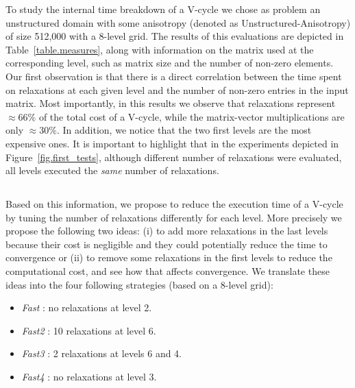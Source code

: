To study the internal time breakdown of a V-cycle we chose as problem an
unstructured domain with some anisotropy (denoted as Unstructured-Anisotropy)
of size 512,000 with a 8-level grid. The results of this evaluations are
depicted in Table~\ref{table.measures}, along with information on the matrix
used at the corresponding level, such as matrix size and the number of non-zero
elements.  Our first observation is that there is a direct correlation between
the time spent on relaxations at each given level and the number of non-zero
entries in the input matrix. Most importantly, in this results we observe that
relaxations represent $\approx66\%$ of the total cost of a V-cycle, while the
matrix-vector multiplications are only $\approx30\%$. In addition, we notice
that the two first levels are the most expensive ones.  It is important to
highlight that in the experiments depicted in Figure~\ref{fig.first_tests},
although different number of relaxations were evaluated, all levels executed
the \emph{same} number of relaxations.

\subsection{}

Based on this information, we propose to reduce the execution time of a V-cycle
by tuning the number of relaxations differently for each level. More precisely
we propose the following two ideas: (i) to add more relaxations in the last
levels because their cost is negligible and they could potentially reduce the
time to convergence or (ii) to remove some relaxations in the first levels to
reduce the computational cost, and see how that affects convergence. We
translate these ideas into the four following strategies (based on a 8-level
grid):

\begin{itemize}
    \item \emph{Fast } : no relaxations at level 2.
    \item \emph{Fast2} : 10 relaxations at level 6.
    \item \emph{Fast3} :  2 relaxations at levels 6 and 4.
    \item \emph{Fast4} : no relaxations at level 3.
\end{itemize}

